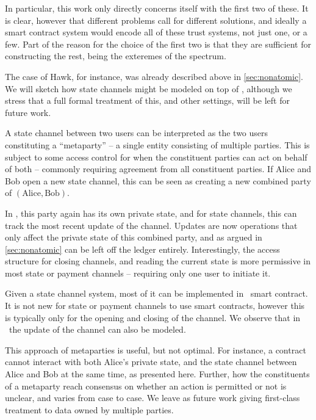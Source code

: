 In particular, this work only directly concerns itself with the first two of
these. It is clear, however that different problems call for different
solutions, and ideally a smart contract system would encode all of these trust
systems, not just one, or a few. Part of the reason for the choice of the first
two is that they are sufficient for constructing the rest, being the exteremes
of the spectrum.

The case of Hawk, for instance, was already described above in
\autoref{sec:nonatomic}. We will sketch how state channels might be
modeled on top of \kachina, although we stress that a full formal treatment of
this, and other settings, will be left for future work.

A state channel between two users can be interpreted as the two users
constituting a ``metaparty'' -- a single entity consisting of multiple parties.
This is subject to some access control for when the constituent parties can act
on behalf of both -- commonly requiring agreement from all constituent parties.
If Alice and Bob open a new state channel, this can be seen as creating a new
combined party of $(\text{Alice}, \text{Bob})$.

In \kachina, this party again has its own private state, and for state channels,
this can track the most recent update of the channel. Updates are now operations
that only affect the private state of this combined party, and as argued in
\autoref{sec:nonatomic} can be left off the ledger entirely. Interestingly,
the access structure for closing channels, and reading the current state is more
permissive in most state or payment channels -- requiring only one user to
initiate it.

Given a state channel system, most of it can be implemented in \ankachina\ smart
contract. It is not new for state or payment channels to use smart contracts,
however this is typically only for the opening and closing of the channel.
We observe that in \kachina\ the update of the channel can also be modeled.

This approach of metaparties is useful, but not optimal. For instance, a
contract cannot interact with both Alice's private state, and the state channel
between Alice and Bob at the same time, as presented here. Further, how the
constituents of a metaparty reach consensus on whether an action is permitted or
not is unclear, and varies from case to case. We leave as future work giving
first-class treatment to data owned by multiple parties.

